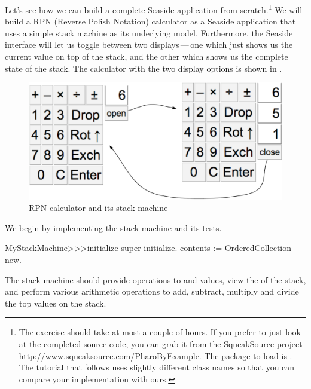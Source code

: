 \documentclass[a4paper,10pt,twoside]{book}
\begin{document}

Let's see how we can build a complete Seaside application from scratch.\footnote{The exercise should take at most a couple of hours. If you prefer to just look at the completed source code, you can grab it from the SqueakSource project \url{http://www.squeaksource.com/PharoByExample}.
The package to load is . The tutorial that follows uses slightly different class names so that you can compare your implementation with ours.}
We will build a RPN (Reverse Polish Notation) calculator as a Seaside application that uses a simple stack machine as its underlying model.
Furthermore, the Seaside interface will let us toggle between two displays\,---\,one which just shows us the current value on top of the stack, and the other which shows us the complete state of the stack.
The calculator with the two display options is shown in .

\begin{figure}[ht]
\begin{center}
\includegraphics[width=\textwidth]{stackMachine}
\caption{RPN calculator and its stack machine}
\end{center}
\end{figure}

We begin by implementing the stack machine and its tests.


\begin{code}{}
MyStackMachine>>>initialize
	super initialize.
	contents := OrderedCollection new.
\end{code}

The stack machine should provide operations to  and  values, view the  of the stack, and perform various arithmetic operations to add, subtract, multiply and divide the top values on the stack.
\end{document}
